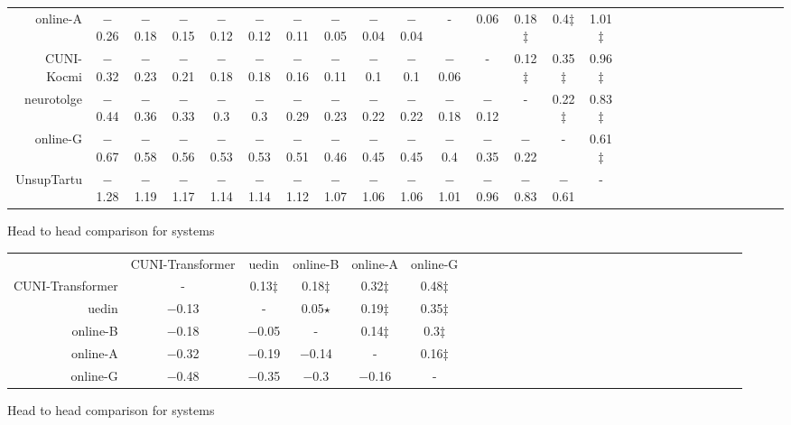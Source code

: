 \begin{tabular}{rccccccccccccccccccccccccccc}
online-A & $-$0.26 & $-$0.18 & $-$0.15 & $-$0.12 & $-$0.12 & $-$0.11 & $-$0.05 & $-$0.04 & $-$0.04 & - &    0.06 &    0.18$\ddagger$ &    0.4$\ddagger$ &    1.01$\ddagger$ \\ 
CUNI-Kocmi & $-$0.32 & $-$0.23 & $-$0.21 & $-$0.18 & $-$0.18 & $-$0.16 & $-$0.11 & $-$0.1 & $-$0.1 & $-$0.06 & - &    0.12$\ddagger$ &    0.35$\ddagger$ &    0.96$\ddagger$ \\ 
neurotolge & $-$0.44 & $-$0.36 & $-$0.33 & $-$0.3 & $-$0.3 & $-$0.29 & $-$0.23 & $-$0.22 & $-$0.22 & $-$0.18 & $-$0.12 & - &    0.22$\ddagger$ &    0.83$\ddagger$ \\ 
online-G & $-$0.67 & $-$0.58 & $-$0.56 & $-$0.53 & $-$0.53 & $-$0.51 & $-$0.46 & $-$0.45 & $-$0.45 & $-$0.4 & $-$0.35 & $-$0.22 & - &    0.61$\ddagger$ \\ 
UnsupTartu & $-$1.28 & $-$1.19 & $-$1.17 & $-$1.14 & $-$1.14 & $-$1.12 & $-$1.07 & $-$1.06 & $-$1.06 & $-$1.01 & $-$0.96 & $-$0.83 & $-$0.61 & - \\ 


\end{tabular}
\caption{Head to head comparison for \ETen systems}
\label{pairwise-eten}


\begin{tabular}{rccccccccccccccccccccccccccc}

 & CUNI-Transformer & uedin & online-B & online-A & online-G \\ 
CUNI-Transformer & - &    0.13$\ddagger$ &    0.18$\ddagger$ &    0.32$\ddagger$ &    0.48$\ddagger$ \\ 
uedin & $-$0.13 & - &    0.05$\star$ &    0.19$\ddagger$ &    0.35$\ddagger$ \\ 
online-B & $-$0.18 & $-$0.05 & - &    0.14$\ddagger$ &    0.3$\ddagger$ \\ 
online-A & $-$0.32 & $-$0.19 & $-$0.14 & - &    0.16$\ddagger$ \\ 
online-G & $-$0.48 & $-$0.35 & $-$0.3 & $-$0.16 & - \\ 


\end{tabular}
\caption{Head to head comparison for \CSen systems}
\label{pairwise-csen}


